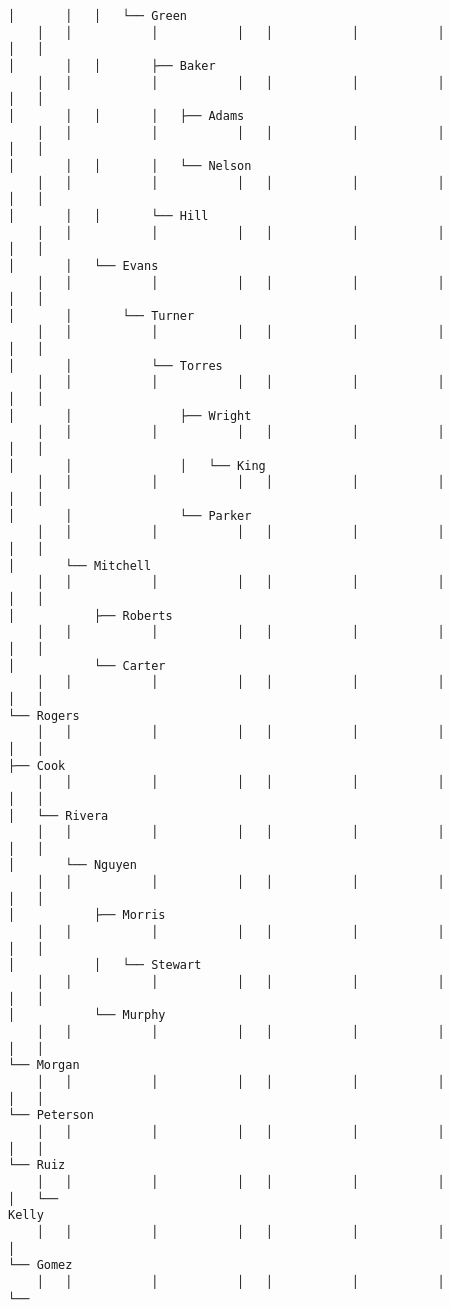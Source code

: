 \documentclass[11pt]{article}
\begin{document}
\begin{Verbatim}[commandchars=\\\{\}]
│       │   │   └── Green
    │   │           │           │   │           │           │           │   │
│       │   │       ├── Baker
    │   │           │           │   │           │           │           │   │
│       │   │       │   ├── Adams
    │   │           │           │   │           │           │           │   │
│       │   │       │   └── Nelson
    │   │           │           │   │           │           │           │   │
│       │   │       └── Hill
    │   │           │           │   │           │           │           │   │
│       │   └── Evans
    │   │           │           │   │           │           │           │   │
│       │       └── Turner
    │   │           │           │   │           │           │           │   │
│       │           └── Torres
    │   │           │           │   │           │           │           │   │
│       │               ├── Wright
    │   │           │           │   │           │           │           │   │
│       │               │   └── King
    │   │           │           │   │           │           │           │   │
│       │               └── Parker
    │   │           │           │   │           │           │           │   │
│       └── Mitchell
    │   │           │           │   │           │           │           │   │
│           ├── Roberts
    │   │           │           │   │           │           │           │   │
│           └── Carter
    │   │           │           │   │           │           │           │   │
└── Rogers
    │   │           │           │   │           │           │           │   │
├── Cook
    │   │           │           │   │           │           │           │   │
│   └── Rivera
    │   │           │           │   │           │           │           │   │
│       └── Nguyen
    │   │           │           │   │           │           │           │   │
│           ├── Morris
    │   │           │           │   │           │           │           │   │
│           │   └── Stewart
    │   │           │           │   │           │           │           │   │
│           └── Murphy
    │   │           │           │   │           │           │           │   │
└── Morgan
    │   │           │           │   │           │           │           │   │
└── Peterson
    │   │           │           │   │           │           │           │   │
└── Ruiz
    │   │           │           │   │           │           │           │   └──
Kelly
    │   │           │           │   │           │           │           │
└── Gomez
    │   │           │           │   │           │           │           └──

\end{Verbatim}
\end{document}
